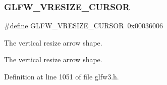 \subsubsection{\texorpdfstring{GLFW\_VRESIZE\_CURSOR}{GLFW\_VRESIZE\_CURSOR}}
{\footnotesize\ttfamily \#define G\+L\+F\+W\+\_\+\+V\+R\+E\+S\+I\+Z\+E\+\_\+\+C\+U\+R\+S\+OR~0x00036006}



The vertical resize arrow shape. 

The vertical resize arrow shape. 

Definition at line 1051 of file glfw3.\+h.

